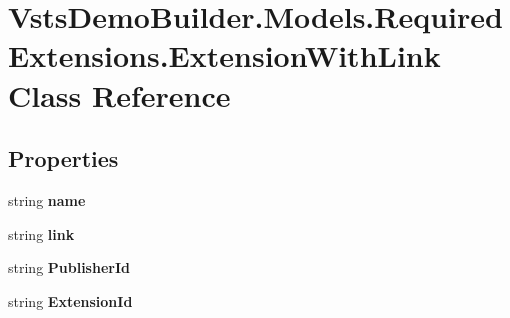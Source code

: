 \hypertarget{class_vsts_demo_builder_1_1_models_1_1_required_extensions_1_1_extension_with_link}{}\section{Vsts\+Demo\+Builder.\+Models.\+Required\+Extensions.\+Extension\+With\+Link Class Reference}
\label{class_vsts_demo_builder_1_1_models_1_1_required_extensions_1_1_extension_with_link}
\subsection*{Properties}
\begin{DoxyCompactItemize}
\item 
\mbox{\label{class_vsts_demo_builder_1_1_models_1_1_required_extensions_1_1_extension_with_link_a5eea6a6e469849a4d053425f8bb3ee53}} 
string {\bfseries name}
\item 
\mbox{\label{class_vsts_demo_builder_1_1_models_1_1_required_extensions_1_1_extension_with_link_aac6c1de60baa19d9cc849e708e305bb3}} 
string {\bfseries link}
\item 
\mbox{\label{class_vsts_demo_builder_1_1_models_1_1_required_extensions_1_1_extension_with_link_afb3e00a5308870392a3120f38a9eec26}} 
string {\bfseries Publisher\+Id}
\item 
\mbox{\label{class_vsts_demo_builder_1_1_models_1_1_required_extensions_1_1_extension_with_link_a220091ea339885776d50c3b826e977a2}} 
string {\bfseries Extension\+Id}
\item 

\end{DoxyCompactItemize}
